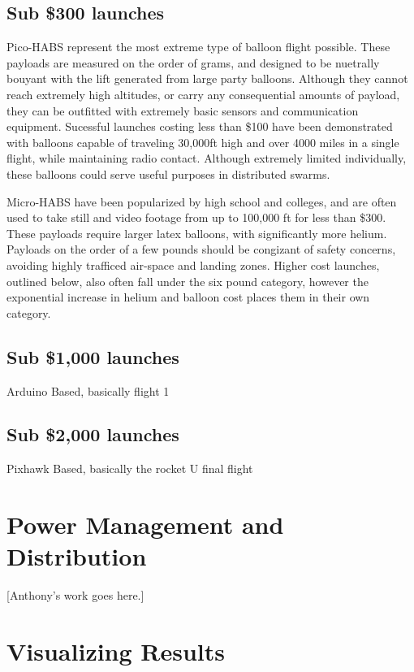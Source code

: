 \documentclass[heading.tex]{subfiles}
\begin{document}
\subsection{Sub \$300 launches}

Pico-HABS represent the most extreme type of balloon flight possible.
These payloads are measured on the order of grams, and designed to be nuetrally
bouyant with the lift generated from large party balloons. Although they cannot
reach extremely high altitudes, or carry any consequential amounts of payload,
they can be outfitted with extremely basic sensors and communication equipment.
Sucessful launches costing less than \$100 have been demonstrated with balloons
capable of traveling 30,000ft high and over 4000 miles in a single flight,
while maintaining radio contact.
\cite{Leo} \cite{Amsat}
Although extremely limited individually,
these balloons could serve useful purposes in distributed swarms.

Micro-HABS have been popularized by high school and colleges, and are often used
to take still and video footage from up to 100,000 ft for less
than \$300. These payloads require larger latex balloons, with significantly
more helium. Payloads on the order of a few pounds should be congizant of safety
concerns, avoiding highly trafficed air-space and landing zones.
Higher cost launches, outlined below, also often fall under the six pound
category, however the exponential increase in helium and balloon cost places
them in their own category.

\subsection{Sub \$1,000 launches}

Arduino Based, basically flight 1

\subsection{Sub \$2,000 launches}

Pixhawk Based, basically the rocket U final flight

\section{Power Management and Distribution}

[Anthony's work goes here.]

\section{Visualizing Results}
\end{document}
